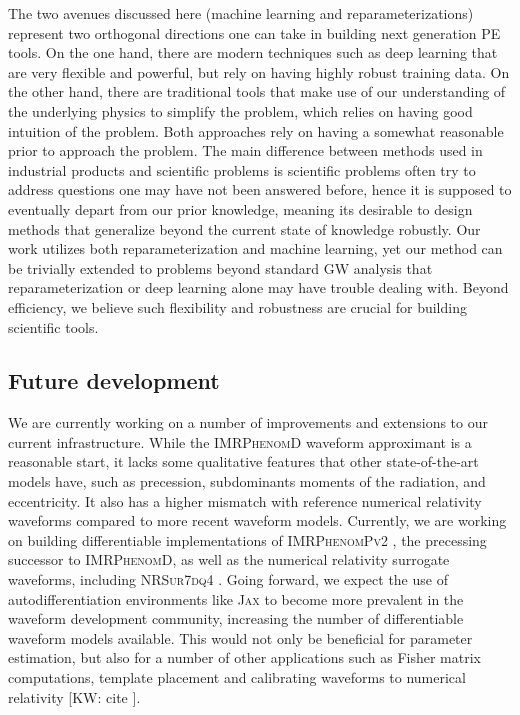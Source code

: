 \documentclass[twocolumn]{aastex631}
\newcommand{\kw}[1]{{\color{rb4}[KW: #1 ]}}
\begin{document}
The two avenues discussed here (machine learning and reparameterizations)
represent two orthogonal directions one can take in building next generation PE
tools. On the one hand, there are modern techniques such as deep learning that
are very flexible and powerful, but rely on having highly robust training data.
On the other hand, there are traditional tools that make use of our
understanding of the underlying physics to simplify the problem, which relies
on having good intuition of the problem. Both approaches rely on having a
somewhat reasonable prior to approach the problem. The main difference between
methods used in industrial products and scientific problems is scientific
problems often try to address questions one may have not been answered before,
hence it is supposed to eventually depart from our prior knowledge, meaning its
desirable to design methods that generalize beyond the current state of
knowledge robustly. Our work utilizes both reparameterization and machine
learning, yet our method can be trivially extended to problems beyond standard
GW analysis that reparameterization or deep learning alone may have trouble
dealing with. Beyond efficiency, we believe such flexibility and robustness are
crucial for building scientific tools.

\subsection{Future development}

We are currently working on a number of improvements and extensions to our
current infrastructure. While the \textsc{IMRPhenomD} waveform approximant is a
reasonable start, it lacks some qualitative features that other
state-of-the-art models have, such as precession, subdominants moments of the
radiation, and eccentricity. It also has a higher mismatch with reference
numerical relativity waveforms compared to more recent waveform models.
Currently, we are working on building differentiable implementations of
\textsc{IMRPhenomPv2} \cite{Khan:2018fmp}, the precessing successor to
\textsc{IMRPhenomD}, as well as the numerical relativity surrogate waveforms,
including \textsc{NRSur7dq4} \cite{Varma:2018mmi}. Going forward, we expect the
use of autodifferentiation environments like \textsc{Jax} \cite{} to become
more prevalent in the waveform development community, increasing the number of
differentiable waveform models available. This would not only be beneficial for
parameter estimation, but also for a number of other applications such as
Fisher matrix computations, template placement and calibrating waveforms to
numerical relativity \kw{cite}.
\end{document}
